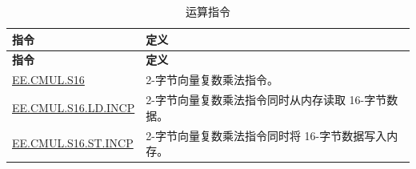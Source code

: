 \begin{longtable}[c]{|l|m{10cm}|}
    \caption{运算指令}
    \label{tab:pie-complex-instructions}\\
    \hline
    \rowcolor{lightgray}
    \textbf{指令} & \textbf{定义} \\\hline
    \endfirsthead
    \rowcolor{lightgray}
    \textbf{指令} & \textbf{定义} \\\hline
    \endhead
    \endfoot
    
    \hyperref[instruction:EECMULS16]{EE.CMUL.S16} & 2-字节向量复数乘法指令。
    \\\hline
    \hyperref[instruction:EECMULS16LDINCP]{EE.CMUL.S16.LD.INCP} & 2-字节向量复数乘法指令同时从内存读取 16-字节数据。
    \\\hline
    \hyperref[instruction:EECMULS16STINCP]{EE.CMUL.S16.ST.INCP} & 2-字节向量复数乘法指令同时将 16-字节数据写入内存。
    \\\hline
\end{longtable}